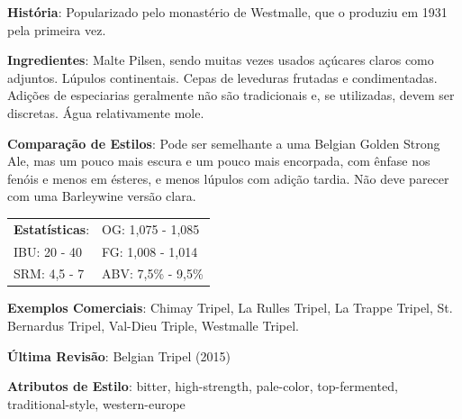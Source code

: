 \textbf{História}: Popularizado pelo monastério de Westmalle, que o produziu em 1931 pela primeira vez.

\textbf{Ingredientes}: Malte Pilsen, sendo muitas vezes usados açúcares claros como adjuntos. Lúpulos continentais. Cepas de leveduras frutadas e condimentadas. Adições de especiarias geralmente não são tradicionais e, se utilizadas, devem ser discretas. Água relativamente mole.

\textbf{Comparação de Estilos}: Pode ser semelhante a uma Belgian Golden Strong Ale, mas um pouco mais escura e um pouco mais encorpada, com ênfase nos fenóis e menos em ésteres, e menos lúpulos com adição tardia. Não deve parecer com uma Barleywine versão clara.

\begin{tabular}{@{}p{35mm}p{35mm}@{}}
  \textbf{Estatísticas}: & OG: 1,075 - 1,085 \\
  IBU: 20 - 40  & FG: 1,008 - 1,014  \\
  SRM: 4,5 - 7  & ABV: 7,5\% - 9,5\%
\end{tabular}

\textbf{Exemplos Comerciais}: Chimay Tripel, La Rulles Tripel, La Trappe Tripel, St. Bernardus Tripel, Val-Dieu Triple, Westmalle Tripel.

\textbf{Última Revisão}: Belgian Tripel (2015)

\textbf{Atributos de Estilo}: bitter, high-strength, pale-color, top-fermented, traditional-style, western-europe
